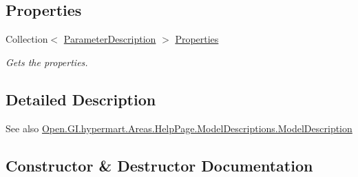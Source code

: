 \subsection*{Properties}
\begin{DoxyCompactItemize}
\item 
Collection$<$ \hyperlink{class_open_1_1_g_i_1_1hypermart_1_1_areas_1_1_help_page_1_1_model_descriptions_1_1_parameter_description}{Parameter\+Description} $>$ \hyperlink{class_open_1_1_g_i_1_1hypermart_1_1_areas_1_1_help_page_1_1_model_descriptions_1_1_complex_type_model_description_aef12ede0391a6d743c2f92b1f94d46c2}{Properties}
\begin{DoxyCompactList}\small\item\em Gets the properties. \end{DoxyCompactList}\end{DoxyCompactItemize}


\subsection{Detailed Description}


\begin{DoxySeeAlso}{See also}
\hyperlink{class_open_1_1_g_i_1_1hypermart_1_1_areas_1_1_help_page_1_1_model_descriptions_1_1_model_description}{Open.\+G\+I.\+hypermart.\+Areas.\+Help\+Page.\+Model\+Descriptions.\+Model\+Description}


\end{DoxySeeAlso}


\subsection{Constructor \& Destructor Documentation}
\hypertarget{class_open_1_1_g_i_1_1hypermart_1_1_areas_1_1_help_page_1_1_model_descriptions_1_1_complex_type_model_description_a750b8a599e8e45d091aebfb26edfb3cd}{}\label{class_open_1_1_g_i_1_1hypermart_1_1_areas_1_1_help_page_1_1_model_descriptions_1_1_complex_type_model_description_a750b8a599e8e45d091aebfb26edfb3cd} 
